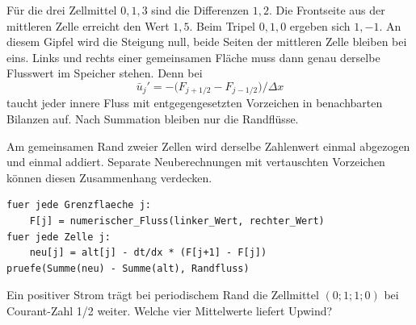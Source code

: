 Für die drei Zellmittel \(0,1,3\) sind die Differenzen \(1,2\). Die Frontseite aus der mittleren Zelle erreicht den Wert \(1{,}5\). Beim Tripel \(0,1,0\) ergeben sich \(1,-1\). An diesem Gipfel wird die Steigung null, beide Seiten der mittleren Zelle bleiben bei eins. Links und rechts einer gemeinsamen Fläche muss dann genau derselbe Flusswert im Speicher stehen. Denn bei
\[
 \bar u_j'=-\big(F_{j+1/2}-F_{j-1/2}\big)/\Delta x
\]
taucht jeder innere Fluss mit entgegengesetzten Vorzeichen in benachbarten Bilanzen auf. Nach Summation bleiben nur die Randflüsse.

Am gemeinsamen Rand zweier Zellen wird derselbe Zahlenwert einmal abgezogen und einmal addiert. Separate Neuberechnungen mit vertauschten Vorzeichen können diesen Zusammenhang verdecken.
{\small\begin{verbatim}
fuer jede Grenzflaeche j:
    F[j] = numerischer_Fluss(linker_Wert, rechter_Wert)
fuer jede Zelle j:
    neu[j] = alt[j] - dt/dx * (F[j+1] - F[j])
pruefe(Summe(neu) - Summe(alt), Randfluss)
\end{verbatim}}
Ein positiver Strom trägt bei periodischem Rand die Zellmittel \((0;1;1;0)\) bei Courant-Zahl 1/2 weiter. Welche vier Mittelwerte liefert Upwind?
